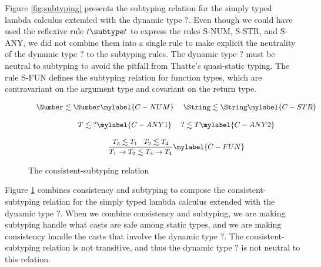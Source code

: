 Figure \ref{fig:subtyping} presents the subtyping relation for the simply
typed lambda calculus extended with the dynamic type $?$.
Even though we could have used the reflexive rule $t \subtype t$ to express
the rules \textsc{S-NUM}, \textsc{S-STR}, and \textsc{S-ANY},
we did not combine them into a single rule to make explicit the
neutrality of the dynamic type $?$ to the subtyping rules.
The dynamic type $?$ must be neutral to subtyping to avoid the pitfall
from Thatte's quasi-static typing.
The rule \textsc{S-FUN} defines the subtyping relation for function types,
which are contravariant on the argument type and covariant on the return type.

\begin{figure}[!ht]
\dstart
$$
\begin{array}{c}
\begin{array}{c}
\Number \lesssim \Number \mylabel{C-NUM}
\end{array}
\;
\begin{array}{c}
\String \lesssim \String \mylabel{C-STR}
\end{array}
\\ \\
\begin{array}{c}
T \lesssim \;? \mylabel{C-ANY1}
\end{array}
\;
\begin{array}{c}
? \lesssim T \mylabel{C-ANY2}
\end{array}
\\ \\
\begin{array}{c}
\dfrac{T_{3} \lesssim T_{1} \;\;\; T_{2} \lesssim T_{4}}
      {T_{1} \rightarrow T_{2} \lesssim T_{3} \rightarrow T_{4}} \mylabel{C-FUN}
\end{array}
\end{array}
$$
\dend
\caption{The consistent-subtyping relation}
\label{fig:consistent-subtyping}
\end{figure}

Figure \ref{fig:consistent-subtyping} combines consistency and subtyping to
compose the consistent-subtyping relation for the simply typed
lambda calculus extended with the dynamic type $?$.
When we combine consistency and subtyping, we are making subtyping handle
what casts are safe among static types, and we are making consistency
handle the casts that involve the dynamic type $?$.
The consistent-subtyping relation is not transitive, and thus
the dynamic type $?$ is not neutral to this relation.

